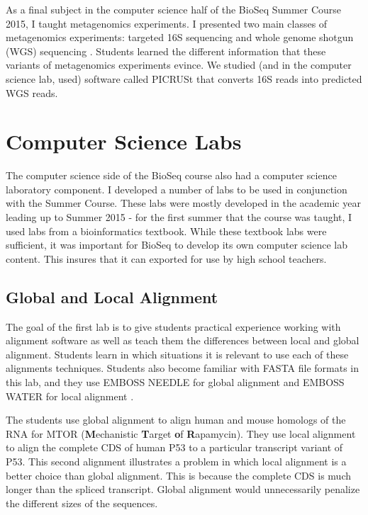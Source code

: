 \documentclass{report}
\begin{document}
As a final subject in the computer science half of the BioSeq Summer Course 2015, I taught metagenomics experiments. I presented two main classes of metagenomics experiments: targeted 16S sequencing \cite{qin2010human} and whole genome shotgun (WGS) sequencing \cite{chen2005bioinformatics}. Students learned the different information that these variants of metagenomics experiments evince. We studied (and in the computer science lab, used) software called PICRUSt \cite{langille2013predictive} that converts 16S reads into predicted WGS reads. 

\section{Computer Science Labs}
The computer science side of the BioSeq course also had a computer science laboratory component. I developed a number of labs to be used in conjunction with the Summer Course. These labs were mostly developed in the academic year leading up to Summer 2015 - for the first summer that the course was taught, I used labs from a bioinformatics textbook. While these textbook labs were sufficient, it was important for BioSeq to develop its own computer science lab content. This insures that it can exported for use by high school teachers.


\subsection{Global and Local Alignment}
The goal of the first lab is to give students practical experience working with alignment software as well as teach them the differences between local and global alignment. Students learn in which situations it is relevant to use each of these alignments techniques. Students also become familiar with FASTA file formats in this lab, and they use EMBOSS NEEDLE for global alignment and EMBOSS WATER for local alignment \cite{rice2000emboss}.

The students use global alignment to align human and mouse homologs of the RNA for MTOR (\textbf{M}echanistic \textbf{T}arget \textbf{o}f \textbf{R}apamycin). They use local alignment to align the complete CDS of human P53 to a particular transcript variant of P53. This second alignment illustrates a problem in which local alignment is a better choice than global alignment. This is because the complete CDS is much longer than the spliced transcript. Global alignment would unnecessarily penalize the different sizes of the sequences. 
\end{document}
